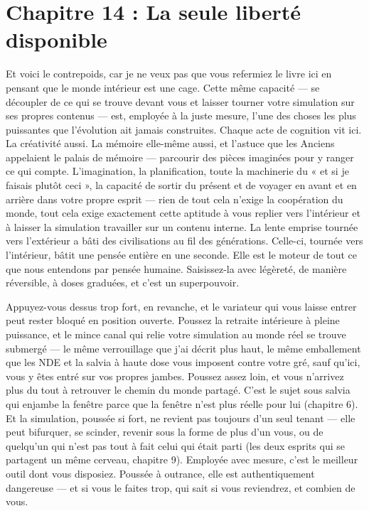\documentclass[11pt, twoside, openright]{book}
\begin{document}
\chapter*{Chapitre 14 : La seule liberté disponible}

Et voici le contrepoids, car je ne veux pas que vous refermiez le livre ici en pensant que le monde intérieur est une cage. Cette même capacité --- se découpler de ce qui se trouve devant vous et laisser tourner votre simulation sur ses propres contenus --- est, employée à la juste mesure, l'une des choses les plus puissantes que l'évolution ait jamais construites. Chaque acte de cognition vit ici. La créativité aussi. La mémoire elle-même aussi, et l'astuce que les Anciens appelaient le palais de mémoire --- parcourir des pièces imaginées pour y ranger ce qui compte. L'imagination, la planification, toute la machinerie du « et si je faisais plutôt ceci », la capacité de sortir du présent et de voyager en avant et en arrière dans votre propre esprit --- rien de tout cela n'exige la coopération du monde, tout cela exige exactement cette aptitude à vous replier vers l'intérieur et à laisser la simulation travailler sur un contenu interne. La lente emprise tournée vers l'extérieur a bâti des civilisations au fil des générations. Celle-ci, tournée vers l'intérieur, bâtit une pensée entière en une seconde. Elle est le moteur de tout ce que nous entendons par pensée humaine. Saisissez-la avec légèreté, de manière réversible, à doses graduées, et c'est un superpouvoir.

Appuyez-vous dessus trop fort, en revanche, et le variateur qui vous laisse entrer peut rester bloqué en position ouverte. Poussez la retraite intérieure à pleine puissance, et le mince canal qui relie votre simulation au monde réel se trouve submergé --- le même verrouillage que j'ai décrit plus haut, le même emballement que les NDE et la salvia à haute dose vous imposent contre votre gré, sauf qu'ici, vous y êtes entré sur vos propres jambes. Poussez assez loin, et vous n'arrivez plus du tout à retrouver le chemin du monde partagé. C'est le sujet sous salvia qui enjambe la fenêtre parce que la fenêtre n'est plus réelle pour lui (chapitre 6). Et la simulation, poussée si fort, ne revient pas toujours d'un seul tenant --- elle peut bifurquer, se scinder, revenir sous la forme de plus d'un vous, ou de quelqu'un qui n'est pas tout à fait celui qui était parti (les deux esprits qui se partagent un même cerveau, chapitre 9). Employée avec mesure, c'est le meilleur outil dont vous disposiez. Poussée à outrance, elle est authentiquement dangereuse --- et si vous le faites trop, qui sait si vous reviendrez, et combien de vous.
\end{document}
